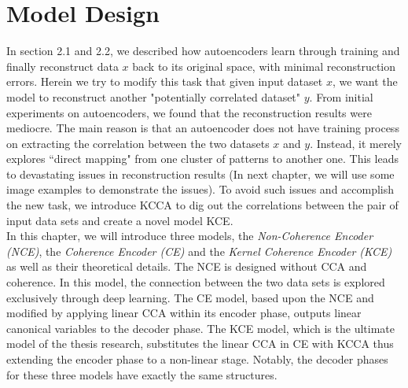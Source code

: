 \documentclass[12pt]{report} %
\begin{document}
\chapter{Model Design}
In section 2.1 and 2.2, we described how autoencoders learn through training and finally reconstruct data $x$ back to its original space, with minimal reconstruction errors. Herein we try to modify this task that given input dataset $x$, we want the model to reconstruct another "potentially correlated dataset" $y$. From initial experiments on autoencoders, we found that the reconstruction results were mediocre. The main reason is that an autoencoder does not have training process on extracting the correlation between the two datasets $x$ and $y$. Instead, it merely explores ``direct mapping" from one cluster of patterns to another one. This leads to devastating issues in reconstruction results (In next chapter, we will use some image examples to demonstrate the issues). To avoid such issues and accomplish the new task, we introduce KCCA to dig out the correlations between the pair of input data sets and create a novel model KCE.  \\
In this chapter, we will introduce three models, the \textit{Non-Coherence Encoder (NCE)}, the \textit{Coherence Encoder (CE)} and the \textit{Kernel Coherence Encoder (KCE)} as well as their theoretical details. The NCE is designed without CCA and coherence. In this model, the connection between the two data sets is explored exclusively through deep learning. The CE model, based upon the NCE and modified by applying linear CCA within its encoder phase, outputs linear canonical variables to the decoder phase. The KCE model, which is the ultimate model of the thesis research, substitutes the linear CCA in CE with KCCA thus extending the encoder phase to a non-linear stage. Notably, the decoder phases for these three models have exactly the same structures. 
\end{document}
